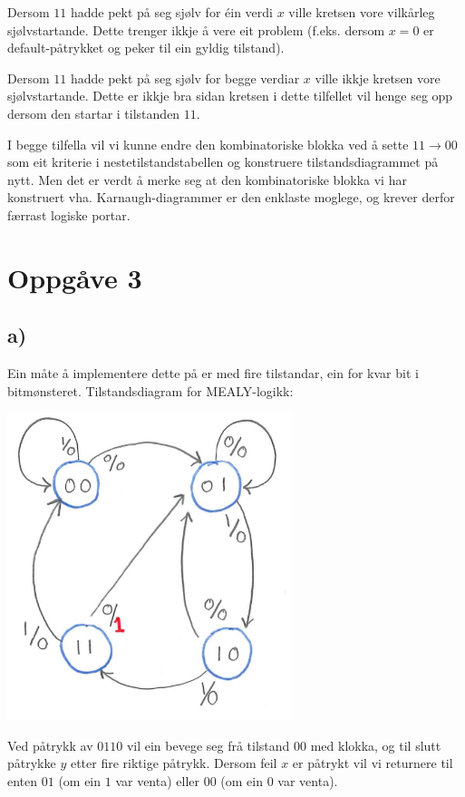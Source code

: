 \documentclass[12pt,a4paper]{article}
\begin{document}
      Dersom $11$ hadde pekt på seg sjølv for éin verdi $x$ ville kretsen vore
      vilkårleg sjølvstartande. Dette trenger ikkje å vere eit problem (f.eks.
      dersom $x=0$ er default-påtrykket og peker til ein gyldig tilstand).
      \bigskip

      Dersom $11$ hadde pekt på seg sjølv for begge verdiar $x$ ville ikkje
      kretsen vore sjølvstartande. Dette er ikkje bra sidan kretsen i dette
      tilfellet vil henge seg opp dersom den startar i tilstanden $11$.
      \bigskip

      I begge tilfella vil vi kunne endre den kombinatoriske blokka ved å sette
      $11 \rightarrow 00$ som eit kriterie i nestetilstandstabellen og
      konstruere tilstandsdiagrammet på nytt. Men det er verdt å merke seg at
      den kombinatoriske blokka vi har konstruert vha. Karnaugh-diagrammer er
      den enklaste moglege, og krever derfor færrast logiske portar.

      \newpage

  \section{Oppgåve 3}
    \subsection{a)}
      Ein måte å implementere dette på er med fire tilstandar, ein for kvar
      bit i bitmønsteret. Tilstandsdiagram for MEALY-logikk:
      \begin{center}
        \includegraphics[width=83mm]{04_3a}
      \end{center}
      Ved påtrykk av $0110$ vil ein bevege seg frå tilstand $00$ med klokka, og
      til slutt påtrykke $y$ etter fire riktige påtrykk. Dersom feil $x$ er
      påtrykt vil vi returnere til enten $01$ (om ein $1$ var venta) eller $00$
      (om ein $0$ var venta).
\end{document}
